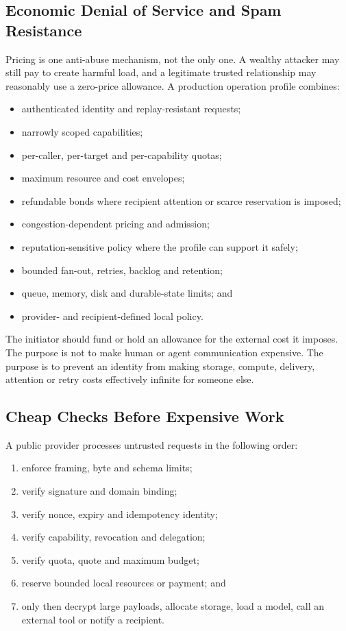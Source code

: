\documentclass[11pt,oneside]{article}
\begin{document}
\subsection{Economic Denial of Service and Spam Resistance}

Pricing is one anti-abuse mechanism, not the only one. A wealthy attacker may still pay to
create harmful load, and a legitimate trusted relationship may reasonably use a zero-price
allowance. A production operation profile combines:

\begin{itemize}
  \item authenticated identity and replay-resistant requests;
  \item narrowly scoped capabilities;
  \item per-caller, per-target and per-capability quotas;
  \item maximum resource and cost envelopes;
  \item refundable bonds where recipient attention or scarce reservation is imposed;
  \item congestion-dependent pricing and admission;
  \item reputation-sensitive policy where the profile can support it safely;
  \item bounded fan-out, retries, backlog and retention;
  \item queue, memory, disk and durable-state limits; and
  \item provider- and recipient-defined local policy.
\end{itemize}

The initiator should fund or hold an allowance for the external cost it imposes. The purpose
is not to make human or agent communication expensive. The purpose is to prevent an identity
from making storage, compute, delivery, attention or retry costs effectively infinite for
someone else.

\subsection{Cheap Checks Before Expensive Work}

A public provider processes untrusted requests in the following order:

\begin{enumerate}
  \item enforce framing, byte and schema limits;
  \item verify signature and domain binding;
  \item verify nonce, expiry and idempotency identity;
  \item verify capability, revocation and delegation;
  \item verify quota, quote and maximum budget;
  \item reserve bounded local resources or payment; and
  \item only then decrypt large payloads, allocate storage, load a model, call an external
        tool or notify a recipient.
\end{enumerate}
\end{document}
